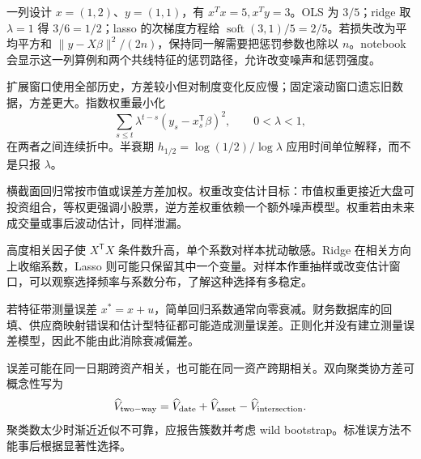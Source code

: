 
一列设计 $x=(1,2)$、$y=(1,1)$，有 $x^Tx=5,x^Ty=3$。OLS 为 $3/5$；ridge 取 $\lambda=1$ 得 $3/6=1/2$；lasso 的次梯度方程给 $\operatorname{soft}(3,1)/5=2/5$。若损失改为平均平方和 $\|y-X\beta\|^2/(2n)$，保持同一解需要把惩罚参数也除以 $n$。notebook 会显示这一列算例和两个共线特征的惩罚路径，允许改变噪声和惩罚强度。


扩展窗口使用全部历史，方差较小但对制度变化反应慢；固定滚动窗口遗忘旧数据，方差更大。指数权重最小化
\[
\sum_{s\le t}\lambda^{t-s}(y_s-x_s^{\mathsf T}\beta)^2,
\qquad 0<\lambda<1,
\]
在两者之间连续折中。半衰期 $h_{1/2}=\log(1/2)/\log\lambda$ 应用时间单位解释，而不是只报 $\lambda$。

横截面回归常按市值或误差方差加权。权重改变估计目标：市值权重更接近大盘可投资组合，等权更强调小股票，逆方差权重依赖一个额外噪声模型。权重若由未来成交量或事后波动估计，同样泄漏。


高度相关因子使 $X^{\mathsf T}X$ 条件数升高，单个系数对样本扰动敏感。Ridge 在相关方向上收缩系数，Lasso 则可能只保留其中一个变量。对样本作重抽样或改变估计窗口，可以观察选择频率与系数分布，了解这种选择有多稳定。

若特征带测量误差 $x^*=x+u$，简单回归系数通常向零衰减。财务数据库的回填、供应商映射错误和估计型特征都可能造成测量误差。正则化并没有建立测量误差模型，因此不能由此消除衰减偏差。


误差可能在同一日期跨资产相关，也可能在同一资产跨期相关。双向聚类协方差可概念性写为
\[
\widehat V_{\rm two-way}=\widehat V_{\rm date}
+\widehat V_{\rm asset}-\widehat V_{\rm intersection}.
\]
聚类数太少时渐近近似不可靠，应报告簇数并考虑 wild bootstrap。标准误方法不能事后根据显著性选择。
